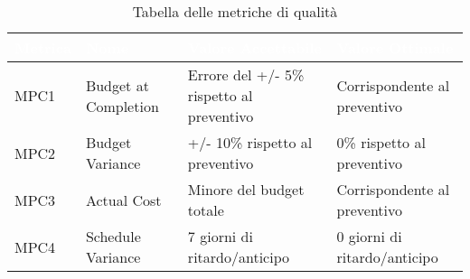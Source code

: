 \begin{table}[H]
  \renewcommand{\arraystretch}{1.25}
  \begin{tabular}{|p{1.7cm}|p{3.5cm}|p{4cm}|p{3.3cm}|} \hline
    \rowcolor[HTML]{036400}
    \textcolor{white}{\textbf{Metrica}} & \textcolor{white}{\textbf{Nome}} & \textcolor{white}{\textbf{Valore Accettabile}} & \textcolor{white}{\textbf{Valore Ottimale}}    \\ \hline
      \rowcolor[HTML]{EFEFEF}
      MPC1 & Budget at Completion & Errore del +/- 5\% rispetto al preventivo & Corrispondente al preventivo \\ \hline
      \rowcolor[HTML]{C0C0C0}
      MPC2 & Budget Variance    &  +/- 10\% rispetto al preventivo & 0\% rispetto al preventivo     \\ \hline
      \rowcolor[HTML]{EFEFEF}
      MPC3 & Actual Cost    & Minore del budget totale  & Corrispondente al preventivo     \\ \hline
      \rowcolor[HTML]{C0C0C0}
      MPC4 & Schedule Variance & 7 giorni di ritardo/anticipo & 0 giorni di ritardo/anticipo     \\ \hline
  \end{tabular}
  \caption{Tabella delle metriche di qualità}
\end{table}
